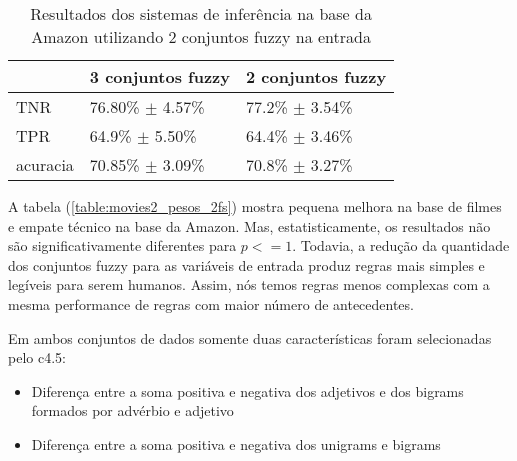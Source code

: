 %
%
%

\begin{table}[!h]
    \begin{tabular}{lll}
    ~         			& 3 conjuntos fuzzy 							& 2 conjuntos fuzzy \\ \hline
    TNR 				& 76.80\% $\pm$ 4.57\%            	& 77.2\% $\pm$ 3.54\%    \\
    TPR    			& 64.9\% $\pm$ 5.50\% 					& 64.4\% $\pm$ 3.46\%   \\
    acuracia  		& 70.85\% $\pm$ 3.09\%         		& 70.8\% $\pm$ 3.27\%    \\
    \end{tabular}
    \caption{Resultados dos sistemas de inferência na base da Amazon utilizando 2 conjuntos fuzzy na entrada}
	\label{table:amazon2_pesos_2fs}
\end{table}

%
%
%

A tabela (\ref{table:movies2_pesos_2fs}) mostra pequena melhora na base de filmes e empate técnico na base da Amazon. Mas, estatisticamente, os resultados não são significativamente diferentes para $p <= 1$. Todavia, a redução da quantidade dos conjuntos fuzzy para as variáveis de entrada produz regras mais simples e legíveis para serem humanos. Assim, nós temos regras menos complexas com a mesma performance de regras com maior número de antecedentes. 

Em ambos conjuntos de dados somente duas características foram selecionadas pelo c4.5:
\begin{itemize}
\item Diferença entre a soma positiva e negativa dos adjetivos e dos bigrams formados por advérbio e adjetivo
\item Diferença entre a soma positiva e negativa dos unigrams e bigrams
\end{itemize}

